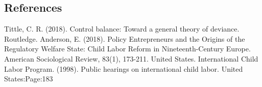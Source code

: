 \documentclass[a4paper, 11pt, margin=1in]{article}
\begin{document}
%
%

\subsection{References}
\begin{thebibliography}{9}
    Tittle, C. R. (2018). Control balance: Toward a general theory of deviance. Routledge.
    Anderson, E. (2018). Policy Entrepreneurs and the Origins of the Regulatory Welfare State: Child Labor Reform in Nineteenth-Century Europe. American Sociological Review, 83(1), 173-211.
    United States. International Child Labor Program. (1998). Public hearings on international child labor. United States:Page:183
\end{thebibliography}
\end{document}
